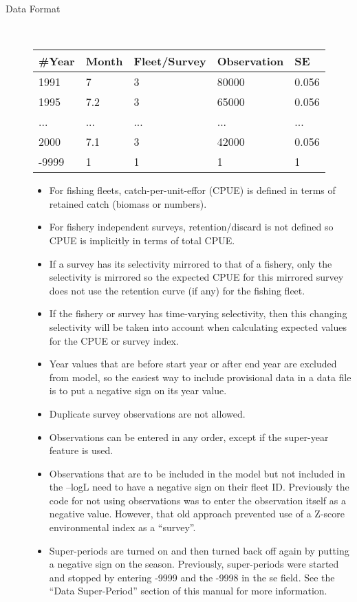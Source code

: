 \begin{description}
	\item[Data Format]\
\begin{center}
	\begin{tabular}{p{3cm} p{2cm} p{3cm} p{3cm} p{3cm}}
		\hline
		\#Year & Month & Fleet/Survey & Observation & SE \\
		\hline
		1991 & 7   & 3   & 80000 & 0.056 \\
		1995 & 7.2 & 3   & 65000 & 0.056 \\
		...  & ... & ... & ...   & ... \\
		2000 & 7.1 & 3   & 42000 & 0.056 \\
		-9999 & 1  & 1   & 1     & 1 \\ 
		\hline
	\end{tabular}
\end{center}
	\begin{itemize}
		\item For fishing fleets, catch-per-unit-effor (CPUE) is defined in terms of retained catch (biomass or numbers).
		\item For fishery independent surveys, retention/discard is not defined so CPUE is implicitly in terms of total CPUE.
		\item If a survey has its selectivity mirrored to that of a fishery, only the selectivity is mirrored so the expected CPUE for this mirrored survey does not use the retention curve (if any) for the fishing fleet.
		\item If the fishery or survey has time-varying selectivity, then this changing selectivity will be taken into account when calculating expected values for the CPUE or survey index.
		\item Year values that are before start year or after end year are excluded from model, so the easiest way to include provisional data in a data file is to put a negative sign on its year value.
		\item Duplicate survey observations are not allowed.
		\item Observations can be entered in any order, except if the super-year feature is used.
		\item Observations that are to be included in the model but not included in the –logL need to have a negative sign on their fleet ID.  Previously the code for not using observations was to enter the observation itself as a negative value.  However, that old approach prevented use of a Z-score environmental index as a “survey”.
		\item Super-periods are turned on and then turned back off again by putting a negative sign on the season.  Previously, super-periods were started and stopped by entering -9999 and the -9998 in the se field.  See the “Data Super-Period” section of this manual for more information.

\end{itemize}
\end{description}
